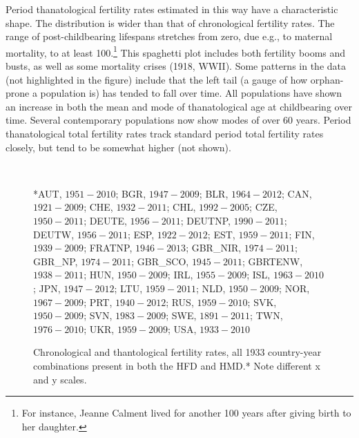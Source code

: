 \documentclass[12pt,oneside,a4paper,leqno]{article}
\begin{document}
Period thanatological fertility rates estimated in this way have a
characteristic shape. The distribution is wider than that of chronological
fertility rates. The range of post-childbearing lifespans stretches from 
zero, due e.g., to maternal mortality, to at least 100.\footnote{For instance,
Jeanne Calment lived for another 100 years after giving birth to her daughter.}
This spaghetti plot includes both fertility booms and busts, as well as some
mortality crises (1918, WWII). Some patterns in the data (not
highlighted in the figure) include that the left tail (a gauge of how
orphan-prone a population is) has tended to fall over time. All populations have shown an increase in both the
mean and mode of thanatological age at childbearing over time. Several
contemporary populations now show modes of over 60 years. Period thanatological total
fertility rates track standard period total fertility rates closely, but tend to be somewhat higher (not shown).
\begin{figure}[h!]
	\caption{Chronological and thantological fertility rates, all 1933
	country-year combinations present in both the HFD and HMD.* Note different x
	and y scales.}
	\label{fig:Fxcompare}
	\begin{center}
	\\
	\end{center}
	\begin{tiny}
	*AUT, $1951-2010$; BGR, $1947-2009$; BLR, $1964-2012$; CAN, $1921-2009$; 
	CHE, $1932-2011$; CHL, $1992-2005$; CZE, $1950-2011$; DEUTE, $1956-2011$; 
	DEUTNP, $1990-2011$; DEUTW, $1956-2011$; ESP, $1922-2012$; EST, $1959-2011$; 
	FIN, $1939-2009$; FRATNP, $1946-2013$; GBR\_NIR, $1974-2011$; GBR\_NP,
	$1974-2011$; GBR\_SCO, $1945-2011$; GBRTENW, $1938-2011$; HUN, $1950-2009$;
	IRL, $1955-2009$; ISL, $1963-2010$; JPN, $1947-2012$; LTU, $1959-2011$; NLD, $1950-2009$; 
	NOR, $1967-2009$; PRT, $1940-2012$; RUS, $1959-2010$; SVK, $1950-2009$; 
	SVN, $1983-2009$; SWE, $1891-2011$; TWN, $1976-2010$; UKR, $1959-2009$; 
	USA, $1933-2010$
	\end{tiny}
\end{figure}
\end{document}
